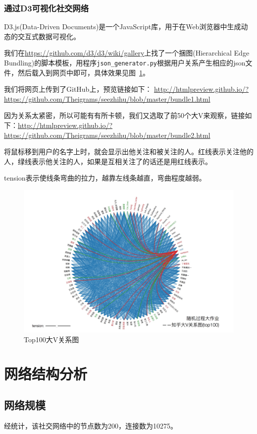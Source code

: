 \documentclass[a4paper]{article}
\begin{document}
\begin{spacing}{1.5}
\subsubsection{通过D3可视化社交网络}
D3.js(Data-Driven Documents)是一个JavaScript库，用于在Web浏览器中生成动态的交互式数据可视化。

我们在\url{https://github.com/d3/d3/wiki/gallery}上找了一个捆图(Hierarchical Edge Bundling)的脚本模板，用程序\verb"json_generator.py"根据用户关系产生相应的json文件，然后载入到网页中即可，具体效果见图~\ref{100}。

我们将网页上传到了GitHub上，预览链接如下：
\url{http://htmlpreview.github.io/?https://github.com/Theigrams/seezhihu/blob/master/bundle1.html}

因为关系太紧密，所以可能有有所卡顿，我们又选取了前50个大V来观察，链接如下：\url{http://htmlpreview.github.io/?https://github.com/Theigrams/seezhihu/blob/master/bundle2.html}

将鼠标移到用户的名字上时，就会显示出他关注和被关注的人。红线表示关注他的人，绿线表示他关注的人，如果是互相关注了的话还是用红线表示。

tension表示使线条弯曲的拉力，越靠左线条越直，弯曲程度越弱。

\begin{figure}[htp]
  \centering
  \includegraphics[width=16cm]{fig/D2.jpg}
  \caption{Top100大V关系图}\label{100}
\end{figure}


\newpage
\section{网络结构分析}\label{sec3}
\subsection{网络规模}
经统计，该社交网络中的节点数为200，连接数为10275。

\end{spacing}
\end{document}
